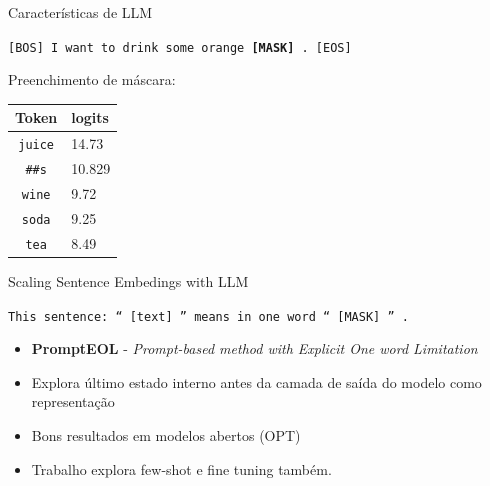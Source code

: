 \documentclass{beamer}
\begin{document}
\begin{frame}{Características de LLM}

  \begin{center}
    \large\texttt{[BOS] I want to drink some orange \textbf{[MASK]} . [EOS]}
  \end{center}

  Preenchimento de máscara:

  \begin{center}
    \begin{tabular}{c|l}
      Token & logits \\
      \hline
      \texttt{juice} & 14.73 \\
      \texttt{\#\#s} & 10.829 \\
      \texttt{wine} & 9.72 \\
      \texttt{soda} & 9.25 \\
      \texttt{tea} & 8.49
    \end{tabular}
  \end{center}

\end{frame}


\begin{frame}{Scaling Sentence Embedings with LLM \cite{jiang2024prompteol}\footnotemark}

  \begin{center}
    \large \texttt{This sentence: `` [text] '' means in one word `` [MASK] '' .}
  \end{center}

  \begin{itemize}
    \item \textbf{PromptEOL} - \emph{Prompt-based method with Explicit One word Limitation}
    \item Explora último estado interno antes da camada de saída do modelo como representação
    \item Bons resultados em modelos abertos (OPT)
    \item Trabalho explora few-shot e fine tuning também.
  \end{itemize}


\end{frame}
\end{document}
